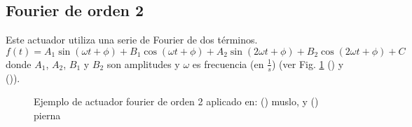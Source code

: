 \documentclass{article}
\begin{document}
\subsection{Fourier de orden 2}
Este actuador utiliza una serie de Fourier de dos t\'erminos. 
\begin{equation}
  f(t) =  A_1 \sin(\omega t+\phi)+B_1 \cos(\omega t+\phi)+A_2 \sin(2\omega t+\phi)+B_2 \cos(2\omega t+\phi)+C
\end{equation}
donde $A_{1}$, $A_{2}$, $B_{1}$ y $B_{2}$ son amplitudes y $\omega$ es frecuencia (en $\frac{1}{s}$) (ver Fig. \ref{actuadores:fourier2} () y ()).
\begin{figure}[H]%
  \centering
  \captionsetup{justification=centering}
  \caption{Ejemplo de actuador fourier de orden 2 aplicado en: (\protect{}) muslo, y (\protect{}) pierna}%
  \label{actuadores:fourier2} %
\end{figure}
\end{document}
